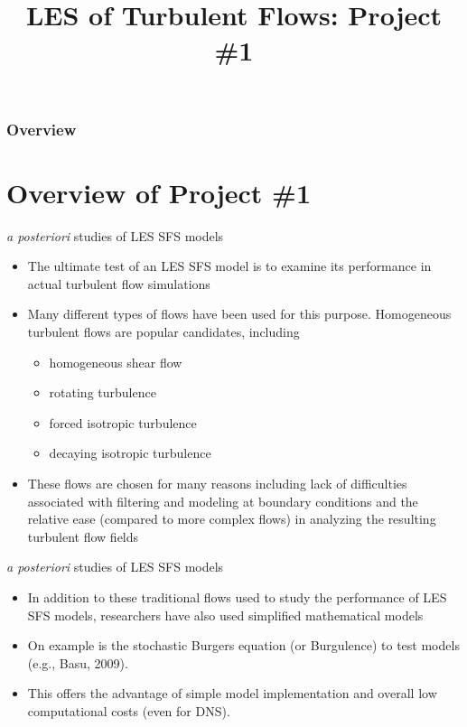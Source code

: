 
\title{LES of Turbulent Flows: Project \#1}



\begin{frame} 
  \titlepage
\end{frame}


\begin{frame}
\frametitle{Overview}
\tableofcontents
\end{frame}

\section{Overview of Project \#1} %
\begin{frame}{\textit{a posteriori} studies of LES SFS models}
\begin{itemize}
	\item The ultimate test of an LES SFS model is to examine its performance in actual turbulent flow simulations
	\item Many different types of flows have been used for this purpose. Homogeneous turbulent flows are popular candidates, including
	\begin{itemize}
	\item  homogeneous shear flow
	\item rotating turbulence
	\item forced isotropic turbulence
	\item decaying isotropic turbulence
	\end{itemize}
	\item These flows are chosen for many reasons including lack of difficulties associated with filtering and modeling at boundary conditions and the relative ease (compared to more complex flows) in analyzing the resulting turbulent flow fields
\end{itemize}
\end{frame}

\begin{frame}{\textit{a posteriori} studies of LES SFS models}
\begin{itemize}
	\item In addition to these traditional flows used to study the performance of LES SFS models, researchers have also used simplified mathematical models
	\item On example is the stochastic Burgers equation (or Burgulence) to test models (e.g., Basu, 2009). 
	\item This offers the advantage of simple model implementation and overall low computational costs (even for DNS).
\end{itemize}
\end{frame}

